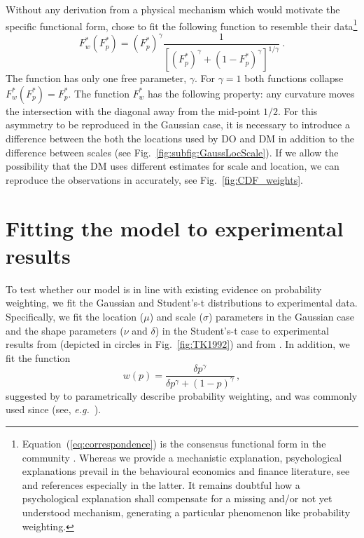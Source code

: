 \documentclass[a4paper, 12pt]{article}
\newcommand{\elabel}[1]{\label{eq:#1}}
\newcommand{\Eref}[1]{Equation~(\ref{eq:#1})}
\newcommand{\fref}[1]{Fig.~\ref{fig:#1}}
\newcommand{\eg}{{\it e.g.}\ }
\newcommand{\be}{\begin{equation}}
\newcommand{\ee}{\end{equation}}
\begin{document}
Without any derivation from a physical mechanism which would motivate the specific functional form, \cite{TverskyKahneman1992} chose to fit the following function to resemble their data\footnote{\Eref{correspondence} is the consensus functional form in the community \cite{Barberis2013}. Whereas we provide a mechanistic explanation, psychological explanations prevail in the behavioural economics and finance literature, see \cite{WuGonzalez1996,Prelec1998,GonzalezWu1999,Stott2006,DeGiorgi2006,Wakker2010,AbdellaouiETAL2011} and references especially in the latter. It remains doubtful how a psychological explanation shall compensate for a missing and/or not yet understood mechanism, generating a particular phenomenon like probability weighting.}
% 
\be
\elabel{correspondence}
F_w^*\left(F_p^*\right) = \left(F_p^*\right)^\gamma \frac{1}{\left[\left(F_p^*\right)^\gamma+\left(1-F_p^*\right)^\gamma\right]^{1/\gamma}} ~.
\ee
% 
The function 
has only one free parameter, $\gamma$. For $\gamma=1$ both functions collapse $F_w^*\left(F_p^*\right)=F_p^*$. The function $F_w^*$ has the following property: any curvature moves the intersection with the diagonal away from the mid-point $1/2$. For this asymmetry to be reproduced in the Gaussian case, it is necessary to introduce a difference between the both the locations used by DO and DM in addition to the difference between scales (see \fref{subfig:GaussLocScale}). If we allow the possibility that the DM uses different estimates for scale and location, we can reproduce the observations in \cite{TverskyKahneman1992} accurately, see \fref{CDF_weights}.



\section{Fitting the model to experimental results}
To test whether our model is in line with existing evidence on probability weighting, we fit the Gaussian and Student's-t distributions to experimental data. Specifically, we fit the location ($\mu$) and scale ($\sigma$) parameters in the Gaussian case and the shape parameters ($\nu$ and $\delta$) in the Student's-t case to experimental results from \cite{TverskyKahneman1992} (depicted in circles in \fref{TK1992}) and from \cite{TverskyFox1995}. In addition, we fit the function
%
\be
w(p)=\frac{\delta p^{\gamma}}{\delta p^{\gamma} + (1-p)^{\gamma}}\,,
\elabel{LattimoreFunction}
\ee
%
suggested by \cite{LattimoreBakerWitte1992} to parametrically describe probability weighting, and was commonly used since (see, \eg \cite{tversky1995risk}).
\end{document}
